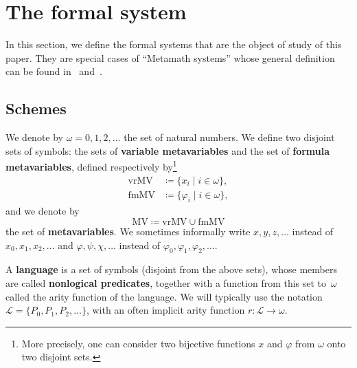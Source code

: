 \documentclass[11pt]{article}
\newcommand*{\define}[1]{\textbf{#1}}%
\renewcommand*{\phi}{\varphi}
\newcommand*{\calL}{\mathcal{L}}
\newcommand*{\vrMV}{\mathrm{vrMV}}
\newcommand*{\fmMV}{\mathrm{fmMV}}
\newcommand*{\MV}{\mathrm{MV}}
\theoremstyle{plain}
\theoremstyle{definition}
\theoremstyle{remark}
\begin{document}
\section{The formal system}
\label{sec:formal}
In this section, we define the formal systems that are the object of study of this paper.
They are special cases of ``Metamath systems\rlap{,}'' whose general definition can be found
in~\cite[Appendix~C.2]{metamath} and~\cite[Subsection~2.1]{carneiro}.



\subsection{Schemes}
\label{subsec:schemes}

We denote by $\omega = 0, 1, 2, \dots$ the set of natural numbers.
We define two disjoint sets of symbols: the sets of \define{variable metavariables} and the set
of \define{formula metavariables}, defined respectively by\footnote{More precisely, one can
consider two bijective functions $x$ and $\phi$ from $\omega$ onto two disjoint sets.}
\begin{align}
\vrMV &\coloneqq \{x_i \mid i \in \omega \},\\
\fmMV &\coloneqq \{\phi_i \mid i \in \omega \},
\end{align}
and we denote by
\begin{equation}
\MV \coloneqq \vrMV \cup \fmMV
\end{equation}
the set of \define{metavariables}.
We sometimes informally write $x, y, z, \dots$ instead of $x_0, x_1, x_2, \dots$ and
$\phi, \psi, \chi, \dots$ instead of $\phi_0, \phi_1, \phi_2, \dots$. 

A \define{language} is a set of symbols (disjoint from the above sets), whose members are called
\define{nonlogical predicates}, together with a function from this set to~$\omega$ called the
arity function of the language.
We will typically use the notation $\calL = \{P_0, P_1, P_2, \dots\}$, with an often implicit
arity function $r \colon \calL \to \omega$.
\end{document}
